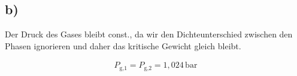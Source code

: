 

\subsection*{b)}

Der Druck des Gases bleibt const., da wir den Dichteunterschied zwischen den Phasen ignorieren und daher das kritische Gewicht gleich bleibt.

\begin{align*}
P_{\text{g,1}} = P_{\text{g,2}} = 1,024 \, \text{bar}
\end{align*}